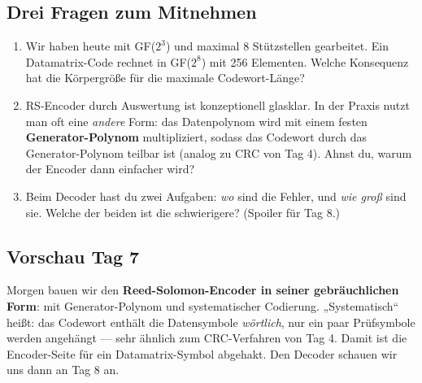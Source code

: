 \subsection*{Drei Fragen zum Mitnehmen}

\begin{enumerate}
\item Wir haben heute mit GF($2^3$) und maximal 8 Stützstellen
  gearbeitet. Ein Datamatrix-Code rechnet in GF($2^8$) mit 256
  Elementen. Welche Konsequenz hat die Körpergröße für die maximale
  Codewort-Länge?

\item RS-Encoder durch Auswertung ist konzeptionell glasklar. In der
  Praxis nutzt man oft eine \emph{andere} Form: das Datenpolynom wird
  mit einem festen \textbf{Generator-Polynom} multipliziert, sodass
  das Codewort durch das Generator-Polynom teilbar ist (analog zu CRC
  von Tag 4). Ahnst du, warum der Encoder dann einfacher wird?

\item Beim Decoder hast du zwei Aufgaben: \emph{wo} sind die Fehler,
  und \emph{wie groß} sind sie. Welche der beiden ist die
  schwierigere? (Spoiler für Tag 8.)
\end{enumerate}

\subsection*{Vorschau Tag 7}

Morgen bauen wir den \textbf{Reed-Solomon-Encoder in seiner
gebräuchlichen Form}: mit Generator-Polynom und systematischer
Codierung. „Systematisch“ heißt: das Codewort enthält die
Datensymbole \emph{wörtlich}, nur ein paar Prüfsymbole werden
angehängt — sehr ähnlich zum CRC-Verfahren von Tag 4. Damit ist die
Encoder-Seite für ein Datamatrix-Symbol abgehakt. Den Decoder schauen
wir uns dann an Tag 8 an.
